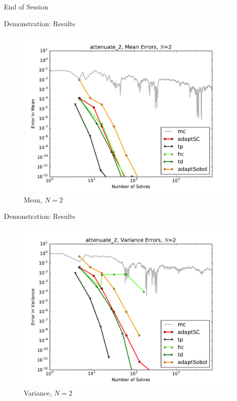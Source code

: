 \documentclass[t,9pt,svgnames]{beamer}
\begin{document}
\begin{frame}{End of Session}
\end{frame}

\begin{frame}{Demonstration: Results}
      \begin{figure}
        \centering
        \includegraphics[width=0.8\linewidth]{../../inputs/paul/attenuate_2_mean_errs}
        \caption{Mean, $N=2$}
      \end{figure}
\end{frame}
\begin{frame}{Demonstration: Results}
      \begin{figure}
        \centering
        \includegraphics[width=0.8\linewidth]{../../inputs/paul/attenuate_2_variance_errs}
        \caption{Variance, $N=2$}
      \end{figure}
\end{frame}
\end{document}
